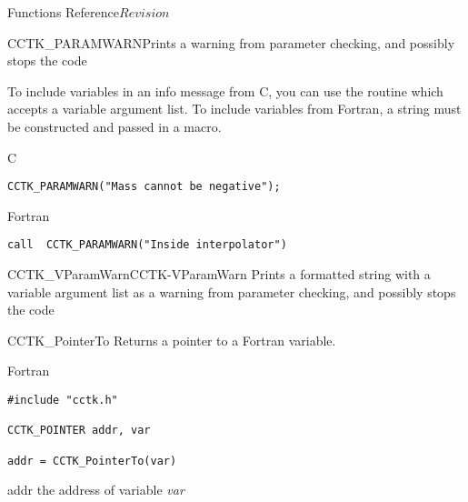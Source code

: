 \begin{cactuspart}{ Functions Reference}{}{$Revision$}
\begin{FunctionDescription}{CCTK\_PARAMWARN}{Prints a warning from parameter checking, and possibly stops the code}
\begin{Discussion}
To include variables in an info message from C, you can use the routine
 which accepts a variable argument list.
To include variables from Fortran, a string must be constructed and passed
in a  macro.
\end{Discussion}
\begin{ExampleSection}
\begin{Example}{C}
\begin{verbatim}
CCTK_PARAMWARN("Mass cannot be negative");
\end{verbatim}
\end{Example}
\begin{Example}{Fortran}
\begin{verbatim}
call  CCTK_PARAMWARN("Inside interpolator")
\end{verbatim}
\end{Example}
\end{ExampleSection}

\begin{SeeAlsoSection}
\begin{SeeAlso2}{CCTK\_VParamWarn}{CCTK-VParamWarn}
Prints a formatted string with a variable argument list as a warning from
parameter checking, and possibly stops the code
\end{SeeAlso2}
\end{SeeAlsoSection}
\end{FunctionDescription}


\begin{FunctionDescription}{CCTK\_PointerTo}%
\label{CCTK-PointerTo}
Returns a pointer to a Fortran variable.

\begin{SynopsisSection}
\begin{Synopsis}{Fortran}
\begin{verbatim}
#include "cctk.h"

CCTK_POINTER addr, var

addr = CCTK_PointerTo(var)
\end{verbatim}
\end{Synopsis}
\end{SynopsisSection}

\begin{ResultSection}
\begin{Result}{addr}
the address of variable {\it var}
\end{Result}
\end{ResultSection}


\end{FunctionDescription}
\end{cactuspart}
